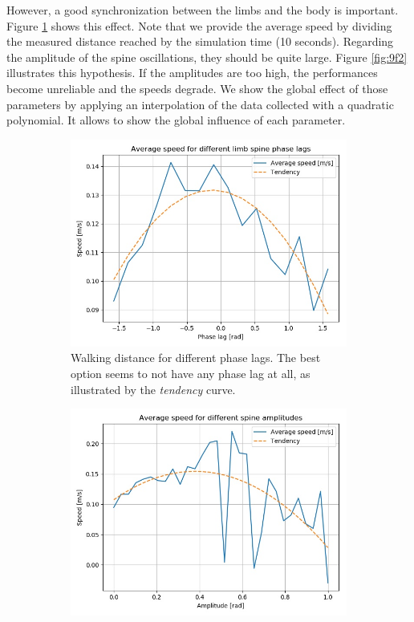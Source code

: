 \documentclass{cmc}
\begin{document}
However, a good synchronization between the limbs and the body is important. Figure \ref{fig:9f1} shows this effect. Note that we provide the average speed by dividing the measured distance reached by the simulation time (10 seconds). Regarding the amplitude of the spine oscillations, they should be quite large. Figure \ref{fig:9f2} illustrates this hypothesis. If the amplitudes are too high, the performances become unreliable and the speeds degrade. We show the global effect of those parameters by applying an interpolation of the data collected with a quadratic polynomial. It allows to show the global influence of each parameter. 

\begin{figure}[!ht]
  \begin{subfigure}[b]{0.48\textwidth}
    \includegraphics[width=\textwidth]{figures/9f/9f1_speed.jpg}
    \caption{Walking distance for different phase lags. The best option seems to not have any phase lag at all, as illustrated by the \textit{tendency} curve. }
    \label{fig:9f1}
  \end{subfigure}
  \begin{subfigure}[b]{0.48\textwidth}
    \includegraphics[width=\textwidth]{figures/9f/9f2_speed.jpg}

\end{subfigure}
\end{figure}
\end{document}
